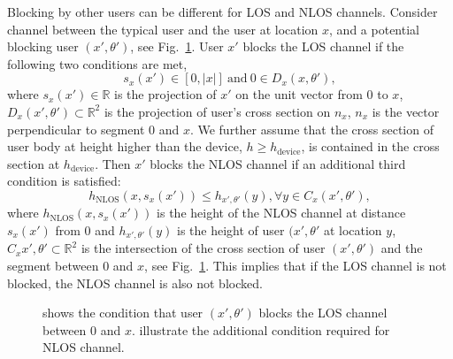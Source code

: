 \documentclass[10pt, conference, letterpaper]{IEEEtran}
\DeclareMathOperator*{\NLOS}{\mathrm{NLOS}}
\begin{document}
Blocking by other users can be different for LOS and NLOS channels. 
Consider channel between the typical user and the user at location $x$, and a potential blocking user $(x', \theta')$, see Fig.~\ref{fig:channel:blockage}.
User $x'$ blocks the LOS channel if the following two conditions are met, 
\begin{equation*}
s_x(x')\in [0,|x|]~\textrm{and}~0 \in D_x(x, \theta'),
\end{equation*}
where $s_x(x')\in \mathbb{R}$ is the projection of $x'$ on the unit vector from 0 to $x$, $D_x(x', \theta')\subset \mathbb{R}^2$ is the projection of user's cross section on $n_x$, $n_x$ is the vector perpendicular to segment $0$ and $x$. 
We further assume that the cross section of user body at height higher than the device, $h\geq h_{\mathrm{device}}$, is contained in the cross section at $h_{\mathrm{device}}$.
Then $x'$ blocks the NLOS channel if an additional third condition is satisfied:
\begin{equation*}
h_{\NLOS}(x, s_x(x')) \leq h_{x', \theta'}(y),\forall y\in C_x(x', \theta'),
\end{equation*}
where $h_{\NLOS}(x, s_x(x'))$ is the height of the NLOS channel at distance $s_x(x')$ from $0$ and $h_{x', \theta'}(y)$ is the height of user $(x', \theta'$ at location $y$, $C_x{x', \theta'}\subset \mathbb{R}^2$ is the intersection of the cross section of user $(x',\theta')$ and the segment between $0$ and $x$, see Fig.~\ref{fig:channel:blockage}.
This implies that if the LOS channel is not blocked, the NLOS channel is also not blocked. 


\begin{figure}[hbt]
	\centering
	 \hfill
	\caption[]{ shows the condition that user $(x', \theta')$ blocks the LOS channel between $0$ and $x$.  illustrate the additional condition required for NLOS channel.}
	\label{fig:channel:blockage}
\end{figure}
\end{document}
